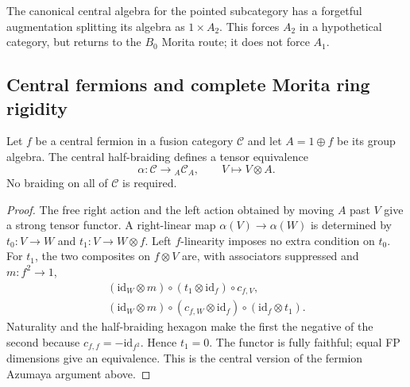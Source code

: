 The canonical central algebra for the pointed subcategory has a forgetful
augmentation splitting its algebra as $1\times A_2$. This forces $A_2$
in a hypothetical category, but returns to the $B_0$ Morita route; it
does not force $A_1$.

\subsection{Central fermions and complete Morita ring rigidity}
\begin{lemma}\label{lem:central-fermion-alpha}
Let $f$ be a central fermion in a fusion category $\mathcal C$ and let
$A=1\oplus f$ be its group algebra. The central half-braiding defines
a tensor equivalence
\[
 \alpha:\mathcal C\longrightarrow {}_A\mathcal C_A,\qquad V\longmapsto V\otimes A.
\]
No braiding on all of $\mathcal C$ is required.
\end{lemma}
\begin{proof}
The free right action and the left action obtained by moving $A$ past
$V$ give a strong tensor functor. A right-linear map $\alpha(V)\to
\alpha(W)$ is determined by $t_0:V\to W$ and $t_1:V\to W\otimes f$.
Left $f$-linearity imposes no extra condition on $t_0$. For $t_1$,
the two composites on $f\otimes V$ are, with associators suppressed
and $m:f^2\to1$,
\[
\begin{split}
(\mathrm{id}_W\otimes m)\circ(t_1\otimes\mathrm{id}_f)\circ c_{f,V},\\
(\mathrm{id}_W\otimes m)\circ(c_{f,W}\otimes\mathrm{id}_f)
                 \circ(\mathrm{id}_f\otimes t_1).
\end{split}
\]
Naturality and the half-braiding hexagon make the first the negative
of the second because $c_{f,f}=-\mathrm{id}_{f^2}$. Hence $t_1=0$.
The functor is fully faithful; equal FP dimensions give an equivalence.
This is the central version of the fermion Azumaya argument above.
\end{proof}

